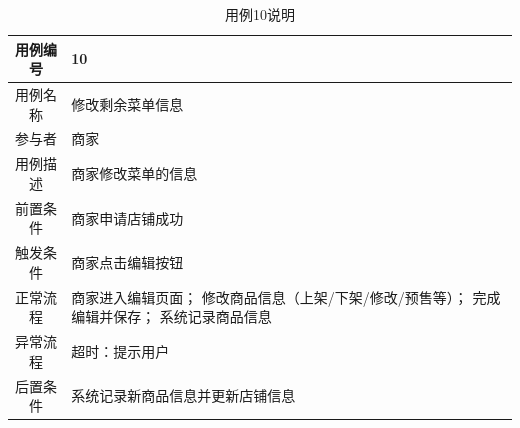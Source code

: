 \documentclass{article}
\begin{document}
    \begin{table}[H]
        \centering
        \caption{用例10说明}
        \begin{tabular}{cm{12cm}}
            \hline
            用例编号 & 10 \\
            \hline
            用例名称 & 修改剩余菜单信息 \\
            \hline
            参与者 & 商家 \\
            \hline
            用例描述 & 商家修改菜单的信息 \\
            \hline
            前置条件 & 商家申请店铺成功 \\
            \hline
            触发条件 & 商家点击编辑按钮 \\
            \hline
            正常流程 & 商家进入编辑页面； 修改商品信息（上架/下架/修改/预售等）； 完成编辑并保存； 系统记录商品信息 \\
            \hline
            异常流程 & 超时：提示用户 \\
            \hline
            后置条件 & 系统记录新商品信息并更新店铺信息 \\
            \hline
        \end{tabular}
    \end{table}
\end{document}
